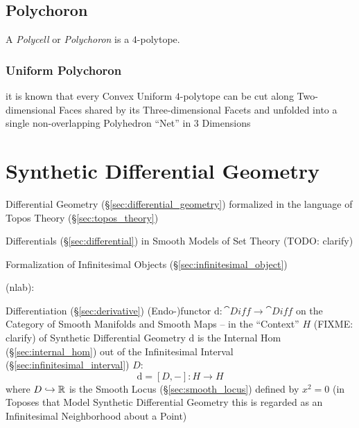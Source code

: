 \subsection{Polychoron}\label{sec:polychoron}

A \emph{Polycell} or \emph{Polychoron} is a $4$-polytope.



\subsubsection{Uniform Polychoron}\label{sec:uniform_polychoron}

it is known that every Convex Uniform $4$-polytope can be cut along
Two-dimensional Faces shared by its Three-dimensional Facets and unfolded into
a single non-overlapping Polyhedron ``Net'' in $3$ Dimensions



\section{Synthetic Differential Geometry}
\label{sec:synthetic_differential_geometry}

Differential Geometry (\S\ref{sec:differential_geometry}) formalized in the
language of Topos Theory (\S\ref{sec:topos_theory})

Differentials (\S\ref{sec:differential}) in Smooth Models of Set Theory
(TODO: clarify)

Formalization of Infinitesimal Objects (\S\ref{sec:infinitesimal_object})

(nlab):

Differentiation (\S\ref{sec:derivative}) (Endo-)functor $\mathrm{d} : \cat{Diff}
\rightarrow \cat{Diff}$ on the Category of Smooth Manifolds and Smooth Maps --
in the ``Context'' $H$ (FIXME: clarify) of Synthetic Differential Geometry
$\mathrm{d}$ is the Internal Hom (\S\ref{sec:internal_hom}) out of the
Infinitesimal Interval (\S\ref{sec:infinitesimal_interval}) $D$:
\[
  \mathrm{d} = [D,-] : H \rightarrow H
\]
where $D \hookrightarrow \mathbb{R}$ is the Smooth Locus (\S\ref{sec:smooth_locus})
defined by $x^2 = 0$ (in Toposes that Model Synthetic Differential Geometry this
is regarded as an Infinitesimal Neighborhood about a Point)



